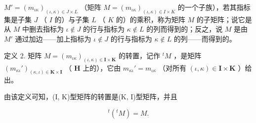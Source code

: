 \(M' = (m_{\iota \kappa})_{(\iota, \kappa) \in J \times L}\) （矩阵 \(M = (m_{\iota \kappa})_{(\iota, \kappa) \in I \times K}\) 的一个子族），若其指标集是子集 \(J\) （ \(I\) 的）与子集 \(L\) （ \(K\) 的）的乘积，称为矩阵 \(M\) 的子矩阵；说它是从 \(M\) 中删去指标为 \(\iota \notin J\) 的行与指标为 \(\kappa \notin L\) 的列而得到的；反之，说 \(M\) 是由 \(M'\) 通过加边——加上指标为 \(\iota \notin J\) 的行与指标为 \(\kappa \notin L\) 的列——而得到的。

定义 2. 矩阵 \(M = (m_{\iota \kappa})_{(\iota, \kappa) \in \mathbf{I} \times \mathbf{K}}\) 的转置，记作 \({}^tM\) ，是矩阵 \((m_{\kappa \iota}')_{(\kappa, \iota) \in \mathbf{K} \times \mathbf{I}}\) （ \(\mathbf{H}\) 上的），它由 \(m_{\kappa \iota}' = m_{\iota \kappa}\) （对所有 \((\iota, \kappa) \in \mathbf{I} \times \mathbf{K}\) ）给出。

由该定义可知，(I, K)型矩阵的转置是(K, I)型矩阵，并且

\[
{ } ^ { t } ( { } ^ { t } M ) = M .\tag{1}
\]

